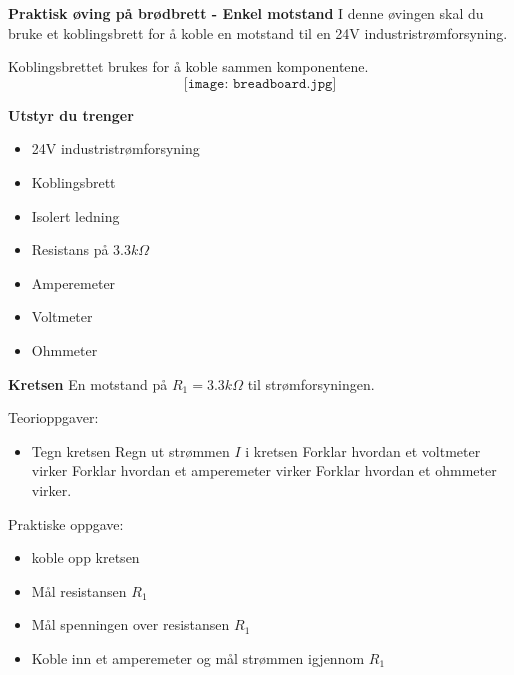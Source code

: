

\large \textbf{Praktisk øving på brødbrett - Enkel motstand}
\normalsize 
\vskip 10pt 
I denne øvingen skal du bruke et koblingsbrett for å koble en motstand til en 24V industristrømforsyning.

\vskip 10pt 
Koblingsbrettet brukes for å koble sammen komponentene.
$$\texttt{[image: breadboard.jpg]}$$


\vskip 10pt 
\large \textbf{Utstyr du trenger}

\vskip 10pt 
\begin{itemize}[noitemsep]

\item 24V industristrømforsyning
\item Koblingsbrett
\item Isolert ledning
\item Resistans på $3.3k\Omega$
\item Amperemeter
\item Voltmeter
\item Ohmmeter
\end{itemize}


\large \textbf{Kretsen}
\normalsize
\vskip 10pt 
En motstand på $R_{1}=3.3k\Omega$ til strømforsyningen. 

\vskip 10pt 
Teorioppgaver:
\begin{itemize}[noitemsep]
\item 
Tegn kretsen
Regn ut strømmen $I$ i kretsen
Forklar hvordan et voltmeter virker
Forklar hvordan et amperemeter virker
Forklar hvordan et ohmmeter virker.
\end{itemize}

Praktiske oppgave:
\begin{itemize}[noitemsep]
\item koble opp kretsen
\item Mål resistansen $R_{1}$
\item Mål spenningen over resistansen $R_{1}$
\item Koble inn et amperemeter og mål strømmen igjennom $R_{1}$
\end{itemize}



 




















